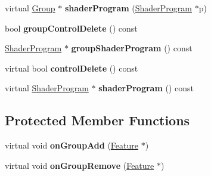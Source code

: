 \begin{DoxyCompactItemize}
\item 
\hypertarget{classj3d_1_1core_1_1Group_ac210250f090296d72f995babe4ce9cc5}{}virtual \hyperlink{classj3d_1_1core_1_1Group}{Group} $\ast$ {\bfseries shader\+Program} (\hyperlink{classj3d_1_1ShaderProgram}{Shader\+Program} $\ast$p)\label{classj3d_1_1core_1_1Group_ac210250f090296d72f995babe4ce9cc5}

\item 
\hypertarget{classj3d_1_1core_1_1Group_a0fac6844c447a8a2ebb63293c7db817d}{}bool {\bfseries group\+Control\+Delete} () const \label{classj3d_1_1core_1_1Group_a0fac6844c447a8a2ebb63293c7db817d}

\item 
\hypertarget{classj3d_1_1core_1_1Group_ad6449590d7a2ca67c5f0d63217a213ea}{}\hyperlink{classj3d_1_1ShaderProgram}{Shader\+Program} $\ast$ {\bfseries group\+Shader\+Program} () const \label{classj3d_1_1core_1_1Group_ad6449590d7a2ca67c5f0d63217a213ea}

\item 
\hypertarget{classj3d_1_1core_1_1Group_af8191deae7d090914af65aa35963fc7a}{}virtual bool {\bfseries control\+Delete} () const \label{classj3d_1_1core_1_1Group_af8191deae7d090914af65aa35963fc7a}

\item 
\hypertarget{classj3d_1_1core_1_1Group_af12b2ca247093cb2dce0eabe4c546aac}{}virtual \hyperlink{classj3d_1_1ShaderProgram}{Shader\+Program} $\ast$ {\bfseries shader\+Program} () const \label{classj3d_1_1core_1_1Group_af12b2ca247093cb2dce0eabe4c546aac}

\end{DoxyCompactItemize}
\subsection*{Protected Member Functions}
\begin{DoxyCompactItemize}
\item 
\hypertarget{classj3d_1_1core_1_1Group_aead6e49eb90b6f6d3811ac4ccfa5f1fa}{}virtual void {\bfseries on\+Group\+Add} (\hyperlink{classj3d_1_1core_1_1Feature}{Feature} $\ast$)\label{classj3d_1_1core_1_1Group_aead6e49eb90b6f6d3811ac4ccfa5f1fa}

\item 
\hypertarget{classj3d_1_1core_1_1Group_ab18fab54fbd0acebc63745c1a47c7a97}{}virtual void {\bfseries on\+Group\+Remove} (\hyperlink{classj3d_1_1core_1_1Feature}{Feature} $\ast$)\label{classj3d_1_1core_1_1Group_ab18fab54fbd0acebc63745c1a47c7a97}

\end{DoxyCompactItemize}
